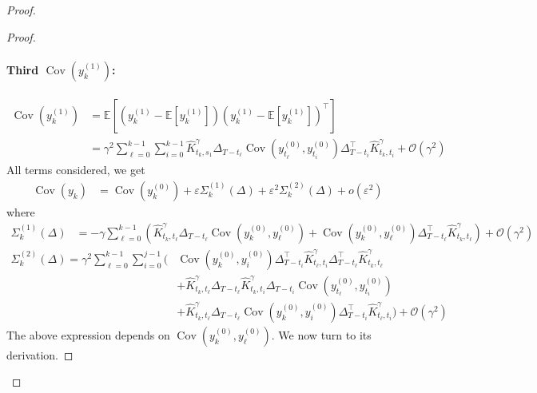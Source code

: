 \documentclass[11pt]{article}
\newcommand{\EE}{\mathbb{E}}
\newcommand{\cov}{\operatorname{Cov}}
\begin{document}
\begin{proof}
\begin{proof}
\paragraph{Third $\cov(y^{(1)}_k)$:}
\begin{align*}
\cov(y^{(1)}_k) &= \EE\left[(y^{(1)}_k- \EE[y^{(1)}_k])(y^{(1)}_k- \EE[y^{(1)}_k])^\top \right] \\
&= \gamma^2 \sum_{\ell=0}^{k-1} \sum_{i=0}^{k-1} \hat K^\gamma_{t_k,s_1} \Delta_{T-t_\ell}   \cov(y^{(0)}_{t_\ell}, y^{(0)}_{t_i})  \Delta_{T-t_i}^\top  \hat K^\gamma_{t_k,t_i} + \mathcal{O}(\gamma^2)
\end{align*}
All terms considered, we get
\begin{align} \label{eq:cov_entire}
\cov(y_k)  &=  \cov(y^{(0)}_k) + \varepsilon \Sigma^{(1)}_k(\Delta) +  \varepsilon^2 \Sigma^{(2)}_k(\Delta) + o(\varepsilon^2) 
\end{align}
where 
\begin{align*} 
\Sigma^{(1)}_k(\Delta) &= - \gamma \sum_{\ell=0}^{k-1} \left( \hat K^\gamma_{t_k,t_\ell} \Delta_{T-t_\ell} \cov(y^{(0)}_k, y^{(0)}_\ell) + \cov(y^{(0)}_k, y^{(0)}_\ell)  \Delta_{T-t_\ell}^\top  \hat K^\gamma_{t_k,t_\ell} \right) + \mathcal{O}(\gamma^2)
\end{align*}
\begin{equation*} 
\begin{split}
\Sigma^{(2)}_k(\Delta) =  \gamma^2 \sum_{\ell=0}^{k-1} \sum_{i=0}^{j-1} \Biggl( &\cov(y^{(0)}_k, y^{(0)}_i)  \Delta_{T-t_i}^\top \hat K^\gamma_{t_\ell,t_i} \Delta_{T-t_\ell}^\top \hat K^\gamma_{t_k,t_\ell} \\
&+ \hat K^\gamma_{t_k,t_\ell} \Delta_{T-t_\ell}  \hat K^\gamma_{t_k,t_i}  \Delta_{T-t_i}  \cov(y^{(0)}_{t_\ell}, y^{(0)}_{t_i})  \\
&+  \hat K^\gamma_{t_k,t_\ell} \Delta_{T-t_\ell} \cov(y^{(0)}_k, y^{(0)}_i) \Delta_{T-t_i}^\top  \hat K^\gamma_{t_\ell,t_i}  \Biggr)  + \mathcal{O}(\gamma^2)
\end{split}
\end{equation*}
The above expression depends on $\cov(y^{(0)}_k, y^{(0)}_\ell)$. We now turn to its derivation. 


\end{proof}
\end{proof}
\end{document}
